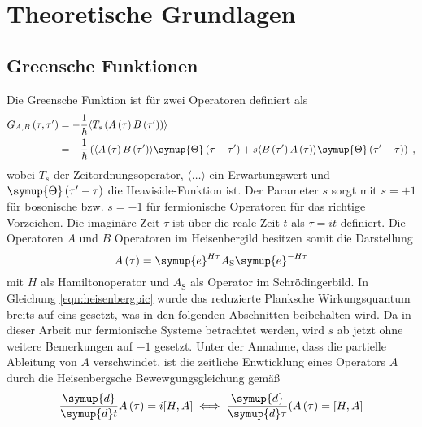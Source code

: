\chapter{Theoretische Grundlagen}
\label{chap:theoretische_grundlagen}
\section{Greensche Funktionen}
Die Greensche Funktion ist für zwei Operatoren definiert als 
\begin{align}
    G_{A,B} \left (\tau, \tau' \right ) &= - \frac{1}{\hbar} \langle T_s \left ( A \left (\tau \right ) B \left ( \tau' \right ) \right ) \rangle \\
    & = - \frac{1}{\hbar} \left(  \langle A \left (\tau \right ) B \left ( \tau' \right ) \rangle \symup{\Theta} \left ( \tau - \tau' \right) + s 
    \langle B \left ( \tau' \right ) A \left (\tau \right ) \rangle \symup{\Theta} \left ( \tau' - \tau \right)  \right ) \; \text{,} \label{eqn:greensfunction}
\end{align}
wobei $T_s$ der Zeitordnungsoperator, $\langle \ldots \rangle$ ein Erwartungswert und $\symup{\Theta} \left ( \tau' - \tau \right)$ die Heaviside-Funktion ist.\cite{anders-fkt}\cite{uhrig-fktzwei}
Der Parameter $s$ sorgt mit $s=+1$ für bosonische bzw. $s=-1$ für fermionische Operatoren für das richtige Vorzeichen.
Die imaginäre Zeit $\tau$ ist über die reale Zeit $t$ als $\tau = it$ definiert.\cite{uhrig-fktzwei}
Die Operatoren $A$ und $B$ Operatoren im Heisenbergild besitzen somit die Darstellung 
\begin{equation}
    A \left ( \tau \right ) = \symup{e}^{H \tau} A_\text{S} \symup{e}^{-H \tau} \label{eqn:heisenbergpic}
\end{equation}
mit $H$ als Hamiltonoperator und $A_\text{S}$ als Operator im Schrödingerbild. 
In Gleichung \eqref{eqn:heisenbergpic} wurde das reduzierte Planksche Wirkungsquantum breits auf eins gesetzt, was in den folgenden Abschnitten beibehalten wird.
Da in dieser Arbeit nur fermionische Systeme betrachtet werden, wird $s$ ab jetzt ohne weitere Bemerkungen auf $-1$ gesetzt.
Unter der Annahme, dass die partielle Ableitung von $A$ verschwindet, ist die zeitliche Enwticklung eines Operators 
$A$ durch die Heisenbergsche Bewewgungsgleichung gemäß 
\begin{equation}
\frac{\symup{d}}{\symup{d}t} A \left (\tau \right ) = i  [H, A] \iff \frac{\symup{d}}{\symup{d}\tau} ( A \left (\tau \right ) = [H, A] \label{eqn:heisenbergeom}
\end{equation}
